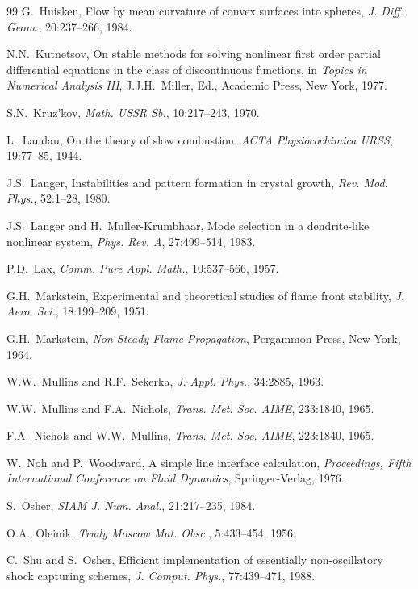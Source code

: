 \documentclass[11pt,a4paper]{article}
\begin{document}
\begin{thebibliography}{99}
G.~Huisken,
Flow by mean curvature of convex surfaces into spheres,
\emph{J. Diff. Geom.}, 20:237--266, 1984.

N.N.~Kutnetsov,
On stable methods for solving nonlinear first order partial differential equations in the class of discontinuous functions,
in \emph{Topics in Numerical Analysis III}, J.J.H.~Miller, Ed., Academic Press, New York, 1977.

S.N.~Kruz'kov,
\emph{Math. USSR Sb.}, 10:217--243, 1970.

L.~Landau,
On the theory of slow combustion,
\emph{ACTA Physiocochimica URSS}, 19:77--85, 1944.

J.S.~Langer,
Instabilities and pattern formation in crystal growth,
\emph{Rev. Mod. Phys.}, 52:1--28, 1980.

J.S.~Langer and H.~Muller-Krumbhaar,
Mode selection in a dendrite-like nonlinear system,
\emph{Phys. Rev. A}, 27:499--514, 1983.

P.D.~Lax,
\emph{Comm. Pure Appl. Math.}, 10:537--566, 1957.

G.H.~Markstein,
Experimental and theoretical studies of flame front stability,
\emph{J. Aero. Sci.}, 18:199--209, 1951.

G.H.~Markstein,
\emph{Non-Steady Flame Propagation},
Pergammon Press, New York, 1964.

W.W.~Mullins and R.F.~Sekerka,
\emph{J. Appl. Phys.}, 34:2885, 1963.

W.W.~Mullins and F.A.~Nichols,
\emph{Trans. Met. Soc. AIME}, 233:1840, 1965.

F.A.~Nichols and W.W.~Mullins,
\emph{Trans. Met. Soc. AIME}, 223:1840, 1965.

W.~Noh and P.~Woodward,
A simple line interface calculation,
\emph{Proceedings, Fifth International Conference on Fluid Dynamics},
Springer-Verlag, 1976.

S.~Osher,
\emph{SIAM J. Num. Anal.}, 21:217--235, 1984.

O.A.~Oleinik,
\emph{Trudy Moscow Mat. Obsc.}, 5:433--454, 1956.

C.~Shu and S.~Osher,
Efficient implementation of essentially non-oscillatory shock capturing schemes,
\emph{J. Comput. Phys.}, 77:439--471, 1988.


\end{thebibliography}
\end{document}
